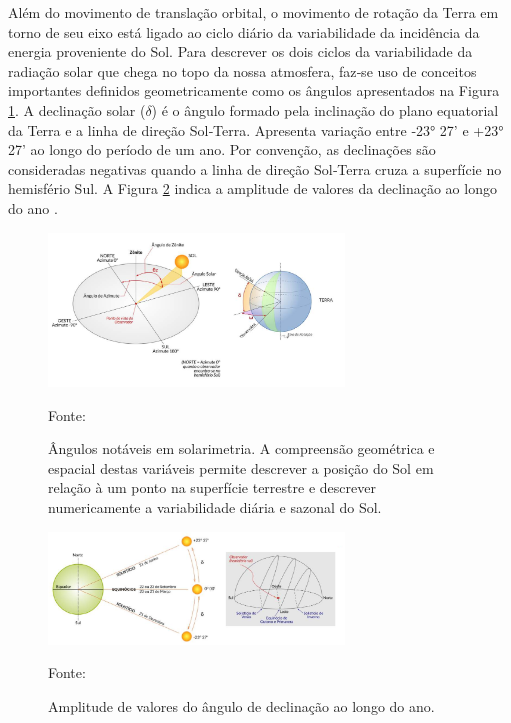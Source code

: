 Além do movimento de translação orbital, o movimento de rotação da Terra em torno de seu eixo está ligado ao ciclo diário da variabilidade da incidência da energia proveniente do Sol. Para descrever os dois ciclos da variabilidade da radiação solar que chega no topo da nossa atmosfera, faz‐se uso de conceitos importantes definidos geometricamente como os ângulos apresentados na Figura \ref{fig:angulo_luz}. A declinação solar ($\delta$) é o ângulo formado pela inclinação do plano equatorial da Terra e a linha de direção Sol‐Terra. Apresenta variação entre ‐23° 27’ e +23° 27’ ao longo do período de um ano. Por convenção, as declinações são consideradas negativas quando a linha de direção Sol‐Terra cruza a superfície no hemisfério Sul. A Figura \ref{fig:amplitude_luz} indica a amplitude de valores da declinação ao longo do ano \cite{atlas2017}.

\begin{figure}[H]
    \centering
    \includegraphics[width=0.7\textwidth]{./Figuras/angulo_luz.png}
    \caption{Ângulos notáveis em solarimetria. A compreensão geométrica e espacial destas variáveis permite descrever a posição do Sol em relação à um ponto na superfície terrestre e descrever numericamente a variabilidade diária e sazonal do Sol.}{Fonte: \cite{atlas2017}}
   \label{fig:angulo_luz}
\end{figure}

\begin{figure}[H]
    \centering
    \includegraphics[width=0.7\textwidth]{./Figuras/amplitude_luz.png}
    \caption{Amplitude de valores do ângulo de declinação ao longo do ano.}{Fonte: \cite{atlas2017}}
   \label{fig:amplitude_luz}
\end{figure}

